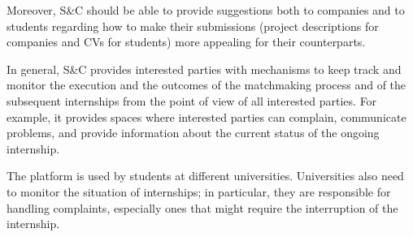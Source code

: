 Moreover, S\&C should be able to provide suggestions both to companies and to students regarding how to make their submissions (project descriptions for companies and CVs for students) more appealing for their counterparts.

In general, S\&C provides interested parties with mechanisms to keep track and monitor the execution and the outcomes of the matchmaking process and of the subsequent internships from the point of view of all interested parties. For example, it provides spaces where interested parties can complain, communicate problems, and provide information about the current status of the ongoing internship.

The platform is used by students at different universities. Universities also need to monitor the situation of internships; in particular, they are responsible for handling complaints, especially ones that might require the interruption of the internship.